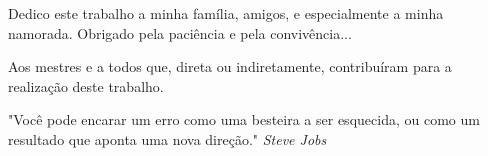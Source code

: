 \documentclass[pnumabnt,normaltoc,espacoumemeio,capchap]{abnt}
\begin{document}
\capa
\folhaderosto

	\par Dedico este trabalho a minha família, amigos, e especialmente a minha namorada. Obrigado pela paciência e pela convivência...


	\par Aos mestres e a todos que, direta ou indiretamente, contribuíram para a realização deste trabalho.


	\par "Você pode encarar um erro como uma besteira a ser esquecida, ou como um resultado que aponta uma nova direção." \emph{Steve Jobs}


\listadefiguras

\sumario


\end{document}
